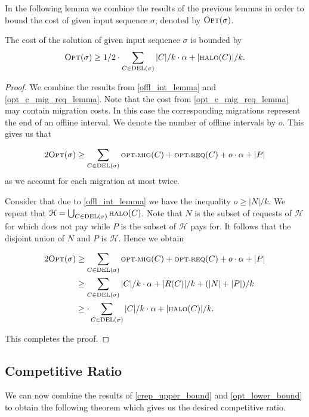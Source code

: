 \documentclass[a4paper,UKenglish,cleveref, autoref, thm-restate,authorcolumns]{lipics-v2019}
\newcommand{\optmig}{\text{\scriptsize OPT-MIG}}
\newcommand{\optreq}{\text{\scriptsize OPT-REQ}}
\newcommand{\del}{\text{\scriptsize DEL}}
\newcommand{\opt}{\text{O{\scriptsize PT}}}
\newcommand{\halo}{\text{\scriptsize HALO}}
\begin{document}
In the following lemma we combine the results of the previous lemmas in order to bound the cost of \opt{} given input sequence $\sigma$, denoted by $\opt(\sigma)$.


\begin{lemma}
	\label{opt_lower_bound}
	The cost of the solution of \opt{} given input sequence $\sigma$ is bounded by
	\begin{align*}
	\opt{}(\sigma)\geq1/2\cdot\sum_{C\in\del{}(\sigma)}|C|/k\cdot\alpha+|\halo(C)|/k.
	\end{align*}
\end{lemma}

\begin{proof}
	We combine the results from \cref{offl_int_lemma} and \cref{opt_c_mig_req_lemma}. Note that the cost from \cref{opt_c_mig_req_lemma} may contain migration costs. In this case the corresponding migrations represent the end of an offline interval. We denote the number of offline intervals by $o$. This gives us that
	
	\begin{align*}
	2\opt{}(\sigma)\geq\sum_{C\in\del(\sigma)}\optmig(C)+\optreq(C)+ o\cdot\alpha+|P|
	\end{align*}
	as we account for each migration at most twice.
	
	Consider that due to \cref{offl_int_lemma} we have the inequality $o\geq|N|/k$. We repeat that $\mathcal{H}=\bigcup_{C\in\del{}(\sigma)}\halo{}(C)$. Note that $N$ is the subset of requests of $\mathcal{H}$ for which \opt{} does not pay while $P$ is the subset of $\mathcal{H}$ \opt{} pays for. It follows that the disjoint union of $N$ and $P$ is $\mathcal{H}$. Hence we obtain
	
	\begin{align*}
	2\opt{}(\sigma)&\geq\sum_{C\in\del(\sigma)}\optmig(C)+\optreq(C)+ o\cdot\alpha+|P|\\
	&\geq\sum_{C\in\del(\sigma)}|C|/k\cdot\alpha+|R(C)|/k+(|N|+|P|)/k\\
	&\geq \cdot\sum_{C\in\del{}(\sigma)}|C|/k\cdot\alpha+|\halo(C)|/k.
	\end{align*}
	
This completes the proof.
\end{proof}


\subsection{Competitive Ratio}

We can now combine the results of \cref{crep_upper_bound} and \cref{opt_lower_bound} to obtain the following theorem which gives us the desired competitive ratio.
\end{document}
